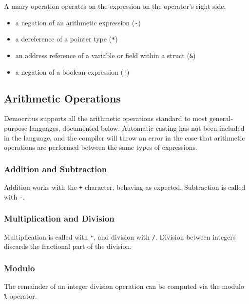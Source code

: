     \noindent
    A unary operation operates on the expression on the operator's right side:
    \begin{itemize}
      \item a negation of an arithmetic expression (\texttt{-})
      \item a dereference of a pointer type (\texttt{*})
      \item an address reference of a variable or field within a struct (\verb|&|)
      \item a negation of a boolean expression (\texttt{!})
    \end{itemize}


      \iffalse
  		\medskip \noindent 
      Array assignment is done with brackets. Note that the size of the array must be specified in the declaration. 
  		\fi
		
		
	\subsection{Arithmetic Operations}
		Democritus supports all the arithmetic operations standard to most general-purpose languages, documented below. Automatic casting has not been included in the language, and the compiler will throw an error in the case that arithmetic operations are performed between the same types of expressions.  


		
		\subsubsection{Addition and Subtraction}
			Addition works with the \texttt{+} character, behaving as expected. Subtraction is called with \texttt{-}.
						
		\subsubsection{Multiplication and Division} 
		  Multiplication is called with \texttt{*}, and division with \texttt{/}. Division between integers discards the fractional part of the division. 	


    \subsubsection{Modulo}
      The remainder of an integer division operation can be computed via the modulo \texttt{\%} operator.
	    \iffalse
		\subsubsection{Bit Shifting}
			Integers can be bit-shifted with \verb|>>| and \verb|<<|.
	  \fi

